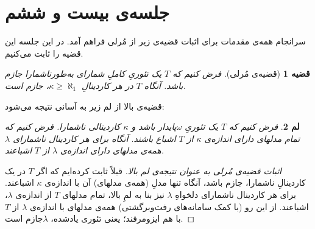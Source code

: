\documentclass[12pt,a4paper]{report}
\theoremstyle{colorhead}
\newtheorem{thm}{قضیه}
\newtheorem{lem}[thm]{لم}
\begin{document}
\section{جلسه‌ی بیست و ششم}
سرانجام همه‌ی مقدمات برای اثبات قضیه‌ی زیر از مُرلی فراهم آمد. در این جلسه این قضیه را ثابت می‌کنیم. 
\begin{thm}[قضیه‌ی مُرلی]
	فرض کنیم که 
	$T$
	یک تئوریِ کاملِ شمارای به‌طورناشمارا جازم باشد. آنگاه 
	$T$
	در هر کاردینالِ 
	$\kappa\geq \aleph_1$،
	جازم است.
	\end{thm}
قضیه‌ی بالا از لم زیر به آسانی نتیجه می‌شود:
\begin{lem}
	فرض کنیم که
	$T$
	یک تئوریِ
	$\omega$پایدار
	باشد
	و 
	$\kappa$
	کاردینالی ناشمارا. فرض کنیم  که
تمام مدلهای دارای اندازه‌ی
	$\kappa$
	از 
	$T$
	 اشباع باشند. آنگاه برای هر
	کاردینال ناشمارای
$\lambda$
همه‌ی مدلهای دارای اندازه‌ی
$\lambda$
از
$T$
اشباعند.
	\end{lem}
\begin{proof}[اثبات قضیه‌ی مُرلی به عنوان نتیجه‌ی لم بالا]
قبلاً ثابت کرده‌ایم که	اگر
	$T$
	در یک کاردینالِ ناشمارا، جازم باشد،‌ آنگاه تنها مدلِ (همه‌ی مدلهای) آن با اندازه‌ی
	$\kappa$
	اشباعند. برای هر کاردینال ناشمارای دلخواهِ
	$\lambda$
	نیز بنا به لمِ بالا، تمام مدلهای 
	$T$
	از اندازه‌ی
	$\lambda$،
	اشباعند. از این رو (با کمک سامانه‌های رفت‌وبرگشتی)  همه‌ی مدلهای
	با اندازه‌ی
	$\lambda$
	از
	$T$
	با هم ایزومرفند؛ یعنی
	تئوری یادشده،
	$\lambda$جازم 
	است. 
	\end{proof}
\end{document}
